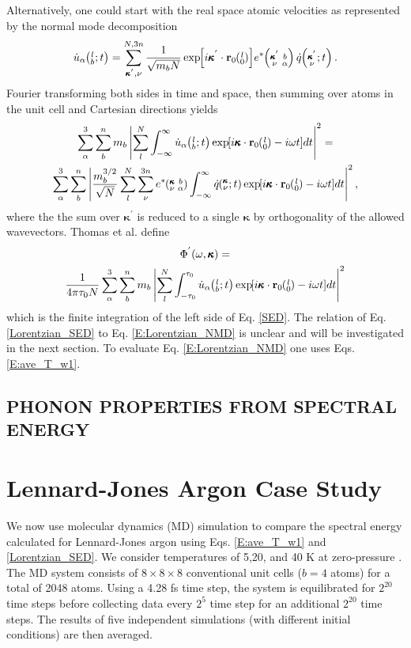 \documentclass[twocolumn,10pt]{asme2e}
\newcommand{\SUMprime}[2]{\ifthenelse{\equal{#1}{0}}{\sum_{\alpha_{#2},b_{#2},l_{#2}}^{3,n,N}} {\ifthenelse{\equal{#1}{1}}{\sum_{\alpha_{#2},b_{#2}}^{3,n}}{\sum_{\pmb{\kappa}^{'}#2,\nu#2}^{N,3n}}}}
\newcommand{\EXP}[1]{\exp\mspace{-5.0mu}\left[#1\right]\mspace{-3.0mu}}
\newcommand{\ab}[2]{\mspace{-4.0mu}\left(\mspace{-8.0mu}\begin{smallmatrix}&\ifthenelse{\equal{#1}{}}{a}{#1} \\&\ifthenelse{\equal{#2}{}}{b}{#2}\end{smallmatrix}\mspace{-3.0mu}\right)}
\newcommand{\kvba}{\mspace{-4.0mu}\left(\mspace{-8.0mu}\begin{smallmatrix} &\pmb{\kappa} &b \\ &\nu &\alpha\end{smallmatrix}\mspace{-3.0mu}\right)}
\newcommand{\kpvba}{\mspace{-4.0mu}\left(\mspace{-8.0mu}\begin{smallmatrix} &\pmb{\kappa}^{'} &b \\ &\nu &\alpha\end{smallmatrix}\mspace{-3.0mu}\right)}
\newcommand{\kvt}{\mspace{-4.0mu}\left(\mspace{-8.0mu}\begin{smallmatrix}&\pmb{\kappa} \\&\nu\end{smallmatrix}\mspace{-2.0mu};t\right)}
\newcommand{\kpvt}{\mspace{-4.0mu}\left(\mspace{-8.0mu}\begin{smallmatrix}&\pmb{\kappa}^{'} \\&\nu\end{smallmatrix}\mspace{-2.0mu};t\right)}
\newcommand{\lbt}{\mspace{-4.0mu}\left(\mspace{-8.0mu}\begin{smallmatrix}&l \\&b\end{smallmatrix}\mspace{-2.0mu};t\right)}
\begin{document}
Alternatively, one could start with the real space atomic velocities as represented by the normal mode decomposition \cite{dove1993}
\begin{equation}\label{E:udot_HLD}
\dot{u}_{\alpha}\lbt =  \SUMprime{2}{} \frac{1}{\sqrt{m_bN}} \EXP{i\pmb{\kappa}^{'}\cdot\mathbf{r}_0\ab{l}{0}} e^*\kpvba \dot{q}\kpvt{}{}{}.
\end{equation}
Fourier transforming both sides in time and space, then summing over atoms in the unit cell and Cartesian directions yields
\begin{multline}\label{SED}
\sum_\alpha^3 \sum_b^n m_b \left| \sum_l^N  \int_{-\infty}^{\infty} \dot{u}_{\alpha}\lbt \EXP{i\pmb{\kappa}\cdot\mathbf{r}_0\ab{l}{0}-i\omega t} dt \right|^2 =
\\ \sum_\alpha^3 \sum_b^n\left| \frac{m_b^{3/2}}{\sqrt{N}} \sum_l^N \sum_{\nu}^{3n} e^*\kvba \int_{-\infty}^{\infty}\dot{q}\kvt\EXP{i\pmb{\kappa}\cdot\mathbf{r}_0\ab{l}{0}-i\omega t}dt\right|^2 ,
\end{multline}
where the the sum over $\pmb{\kappa}^{'}$ is reduced to a single $\pmb{\kappa}$ by orthogonality of the allowed wavevectors. Thomas et al. \cite{thomas2010c} define
\begin{multline}\label{Lorentzian_SED}
\Phi^{'}(\omega,\pmb{\kappa}) =
\\ \frac{1}{4\pi\tau_0N} \sum_\alpha^3 \sum_b^n m_b \left| \sum_l^N  \int_{-\tau_0}^{\tau_0} \dot{u}_{\alpha}\lbt \EXP{i\pmb{\kappa}\cdot\mathbf{r}_0\ab{l}{0}-i\omega t} dt \right|^2
\end{multline}
which is the finite integration of the left side of Eq$.$ \eqref{SED}. The relation of Eq$.$ \eqref{Lorentzian_SED} to Eq$.$ \eqref{E:Lorentzian_NMD} is unclear and will be investigated in the next section. To evaluate Eq$.$ \eqref{E:Lorentzian_NMD} one uses Eqs$.$ \eqref{E:ave_T_w1}.

\subsection*{PHONON PROPERTIES FROM SPECTRAL ENERGY}\label{S:Properties}

\section*{Lennard-Jones Argon Case Study}\label{S:LJ_Case_study}

We now use molecular dynamics (MD) simulation to compare the spectral energy calculated for Lennard-Jones argon \cite{} using Eqs$.$ \eqref{E:ave_T_w1} and \eqref{Lorentzian_SED}. We consider temperatures of 5,20, and 40 K at zero-pressure \cite{mcgaughey2004c}.  The MD system consists
of $8\times 8\times 8$ conventional unit cells ($b=4$ atoms) for a total of 2048 atoms.
Using a 4.28 fs time step, the system is equilibrated for $2^{20}$ time steps before collecting data every $2^5$ time step for an additional $2^{20}$ time steps. The results of five independent simulations (with different initial conditions) are then averaged.
\end{document}

